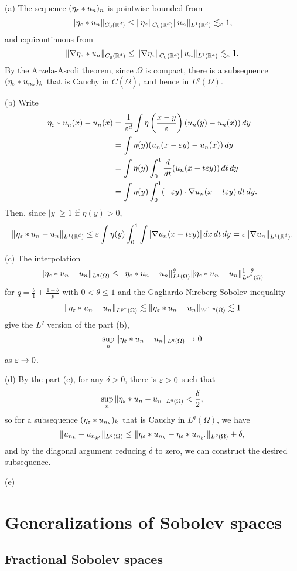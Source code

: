 \documentclass{../note}
\begin{document}
\begin{pf}
(a)
The sequence $(\eta_\varepsilon*u_n)_n$ is pointwise bounded from
\[\|\eta_\varepsilon*u_n\|_{C_0(\mathbb{R}^d)}\le\|\eta_\varepsilon\|_{C_0(\mathbb{R}^d)}\|u_n\|_{L^1(\mathbb{R}^d)}\lesssim_\varepsilon1,\]
and equicontinuous from
\[\|\nabla\eta_\varepsilon*u_n\|_{C_0(\mathbb{R}^d)}\le\|\nabla\eta_\varepsilon\|_{C_0(\mathbb{R}^d)}\|u_n\|_{L^1(\mathbb{R}^d)}\lesssim_\varepsilon1.\]
By the Arzela-Ascoli theorem, since $\bar\Omega$ is compact, there is a subsequence $(\eta_\varepsilon*u_{n_k})_k$ that is Cauchy in $C(\bar\Omega)$, and hence in $L^q(\Omega)$.

(b)
Write
\begin{align*}
\eta_\e*u_n(x)-u_n(x)
&=\frac1{\e^d}\int\eta\left(\frac{x-y}\e\right)(u_n(y)-u_n(x))\,dy\\
&=\int\eta(y)(u_n(x-\e y)-u_n(x))\,dy\\
&=\int\eta(y)\int_0^1\dd{t}(u_n(x-t\e y))\,dt\,dy\\
&=\int\eta(y)\int_0^1(-\e y)\cdot\nabla u_n(x-t\e y)\,dt\,dy.
\end{align*}
Then, since $|y|\ge1$ if $\eta(y)>0$,
\[\|\eta_\varepsilon*u_n-u_n\|_{L^1(\mathbb{R}^d)}\le\varepsilon\int\eta(y)\int_0^1\int|\nabla u_n(x-t\varepsilon y)|\,dx\,dt\,dy=\varepsilon\|\nabla u_n\|_{L^1(\mathbb{R}^d)}.\]

(c)
The interpolation
\[\|\eta_\varepsilon*u_n-u_n\|_{L^q(\Omega)}\le\|\eta_\varepsilon*u_n-u_n\|_{L^1(\Omega)}^\theta\|\eta_\varepsilon*u_n-u_n\|_{L^{p^*}(\Omega)}^{1-\theta}\]
for $q=\frac\theta1+\frac{1-\theta}p$ with $0<\theta\le1$ and the Gagliardo-Nireberg-Sobolev inequality
\[\|\eta_\varepsilon*u_n-u_n\|_{L^{p^*}(\Omega)}\lesssim\|\eta_\varepsilon*u_n-u_n\|_{W^{1,p}(\Omega)}\lesssim1\]
give the $L^q$ version of the part (b),
\[\sup_n\|\eta_\varepsilon*u_n-u_n\|_{L^q(\Omega)}\to0\]
as $\varepsilon\to0$.

(d)
By the part (c), for any $\delta>0$, there is $\varepsilon>0$ such that
\[\sup_n\|\eta_\varepsilon*u_n-u_n\|_{L^q(\Omega)}<\frac\delta2,\]
so for a subsequence $(\eta_\varepsilon*u_{n_k})_k$ that is Cauchy in $L^q(\Omega)$, we have
\[\|u_{n_k}-u_{n_{k'}}\|_{L^q(\Omega)}\le\|\eta_\varepsilon*u_{n_k}-\eta_\varepsilon*u_{n_{k'}}\|_{L^q(\Omega)}+\delta,\]
and by the diagonal argument reducing $\delta$ to zero, we can construct the desired subsequence.

(e)
\end{pf}




\chapter{Generalizations of Sobolev spaces}
\section{Fractional Sobolev spaces}
\end{document}
